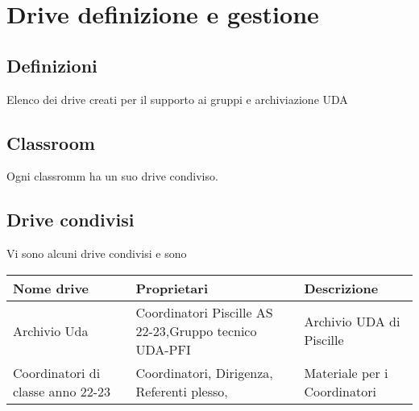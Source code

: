 
\chapter{Drive definizione e gestione}
\printpartialtoc
\section{Definizioni}
Elenco dei drive creati per il supporto ai gruppi e archiviazione UDA
\section{Classroom}
Ogni classromm  ha un suo drive condiviso.
\section{Drive condivisi}
Vi sono alcuni drive condivisi e sono

\begin{center}
	\begin{tabular}{p{3.2cm}p{3.2cm}p{3.2cm}}
\toprule
Nome drive	& Proprietari &  Descrizione \\
\midrule
Archivio Uda	& Coordinatori Piscille AS 22-23,Gruppo tecnico UDA-PFI & Archivio UDA di Piscille \\
Coordinatori di classe anno 22-23&Coordinatori, Dirigenza, Referenti plesso, &Materiale per i Coordinatori\\
\bottomrule
\end{tabular}
\end{center}
